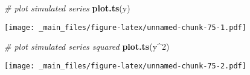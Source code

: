 \documentclass[
]{book}
\newenvironment{Shaded}{\begin{snugshade}}{\end{snugshade}}
\newcommand{\CommentTok}[1]{\textcolor[rgb]{0.56,0.35,0.01}{\textit{#1}}}
\newcommand{\DecValTok}[1]{\textcolor[rgb]{0.00,0.00,0.81}{#1}}
\newcommand{\FunctionTok}[1]{\textcolor[rgb]{0.13,0.29,0.53}{\textbf{#1}}}
\newcommand{\NormalTok}[1]{#1}
\newcommand{\SpecialCharTok}[1]{\textcolor[rgb]{0.81,0.36,0.00}{\textbf{#1}}}
\begin{document}
\begin{Shaded}
\begin{Highlighting}[]
\CommentTok{\# plot simulated series}
\FunctionTok{plot.ts}\NormalTok{(y)}
\end{Highlighting}
\end{Shaded}

\texttt{[image: \_main\_files/figure-latex/unnamed-chunk-75-1.pdf]}

\begin{Shaded}
\begin{Highlighting}[]
\CommentTok{\# plot simulated series squared}
\FunctionTok{plot.ts}\NormalTok{(y}\SpecialCharTok{\^{}}\DecValTok{2}\NormalTok{)}
\end{Highlighting}
\end{Shaded}

\texttt{[image: \_main\_files/figure-latex/unnamed-chunk-75-2.pdf]}
\end{document}
